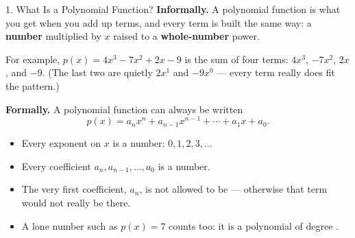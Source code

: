 \documentclass[10pt]{article}
\begin{document}
\vspace{0.1in}

\boxguard
\begin{notesbox}{1. What Is a Polynomial Function?}
\textbf{Informally.} A polynomial function is what you get when you add up terms,
and every term is built the same way: a \textbf{number} multiplied by $x$ raised to
a \textbf{whole-number} power.

\medskip
For example, $p(x) = 4x^3 - 7x^2 + 2x - 9$ is the sum of four terms:
$4x^3$, \; $-7x^2$, \; $2x$, \; and $-9$.
(The last two are quietly $2x^1$ and $-9x^0$ --- every term really does fit the
pattern.)

\medskip
\textbf{Formally.} A polynomial function can always be written
\[
  p(x) = a_n x^n + a_{n-1}x^{n-1} + \cdots + a_1 x + a_0 .
\]

\begin{itemize}[itemsep=4pt]
  \item Every exponent on $x$ is a \blank{3.2cm} number: $0, 1, 2, 3, \ldots$
  \item Every coefficient $a_n, a_{n-1}, \ldots, a_0$ is a \blank{2.6cm} number.
  \item The very first coefficient, $a_n$, is not allowed to be \blank{1.4cm}
        --- otherwise that term would not really be there.
  \item A lone number such as $p(x) = 7$ counts too: it is a polynomial of degree
        \blank{1.4cm}.
\end{itemize}
\end{notesbox}

\vspace{0.1in}
\end{document}
